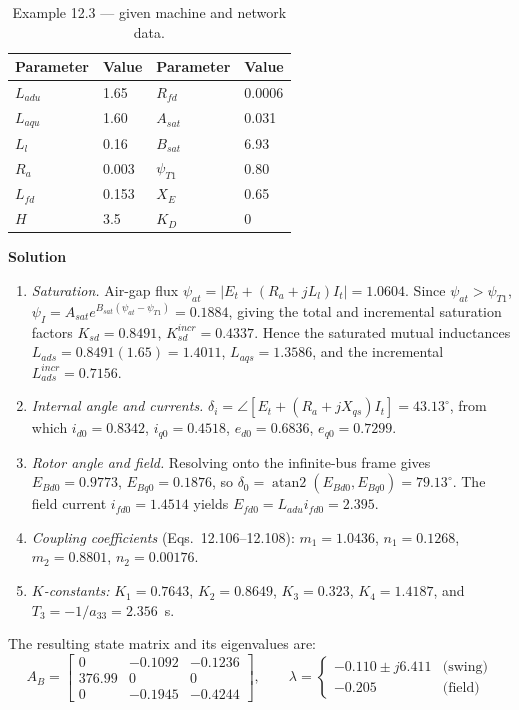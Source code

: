 \documentclass[12pt,a4paper]{article}
\begin{document}
\begin{table}[H]
\centering
\caption{Example 12.3 --- given machine and network data.}
\label{tab:Bgiven}
\begin{tabular}{@{}llll@{}}
\toprule
Parameter & Value & Parameter & Value \\
\midrule
$L_{adu}$ & 1.65 & $R_{fd}$  & 0.0006 \\
$L_{aqu}$ & 1.60 & $A_{sat}$ & 0.031 \\
$L_l$     & 0.16 & $B_{sat}$ & 6.93 \\
$R_a$     & 0.003 & $\psi_{T1}$ & 0.80 \\
$L_{fd}$  & 0.153 & $X_E$ & 0.65 \\
$H$       & 3.5 & $K_D$ & 0 \\
\bottomrule
\end{tabular}
\end{table}
\newpage
\textbf{Solution}
\begin{enumerate}
\item \textit{Saturation.} Air-gap flux
      $\psi_{at} = |E_t + (R_a + jL_l)I_t| = 1.0604$. Since
      $\psi_{at}>\psi_{T1}$,
      $\psi_I = A_{sat}e^{B_{sat}(\psi_{at}-\psi_{T1})} = 0.1884$, giving the
      total and incremental saturation factors $K_{sd}=0.8491$,
      $K_{sd}^{incr}=0.4337$. Hence the saturated mutual inductances
      $L_{ads}=0.8491(1.65)=1.4011$, $L_{aqs}=1.3586$, and the incremental
      $L_{ads}^{incr}=0.7156$.
\item \textit{Internal angle and currents.}
      $\delta_i = \angle\!\left[E_t + (R_a + jX_{qs})I_t\right] = 43.13^\circ$,
      from which $i_{d0}=0.8342$, $i_{q0}=0.4518$, $e_{d0}=0.6836$,
      $e_{q0}=0.7299$.
\item \textit{Rotor angle and field.} Resolving onto the infinite-bus frame
      gives $E_{Bd0}=0.9773$, $E_{Bq0}=0.1876$, so
      $\delta_0 = \operatorname{atan2}(E_{Bd0},E_{Bq0}) = 79.13^\circ$. The field
      current $i_{fd0}=1.4514$ yields $E_{fd0}=L_{adu}i_{fd0}=2.395$.
\item \textit{Coupling coefficients} (Eqs.~12.106--12.108):
      $m_1 = 1.0436$, $n_1 = 0.1268$, $m_2 = 0.8801$, $n_2 = 0.00176$.
\item \textit{$K$-constants:} $K_1 = 0.7643$, $K_2 = 0.8649$, $K_3 = 0.323$,
      $K_4 = 1.4187$, and $T_3 = -1/a_{33} = 2.356$~s.
\end{enumerate}

The resulting state matrix and its eigenvalues are:
\begin{equation}
A_B =
\begin{bmatrix}
0 & -0.1092 & -0.1236 \\
376.99 & 0 & 0 \\
0 & -0.1945 & -0.4244
\end{bmatrix},
\qquad
\lambda =
\begin{cases}
-0.110 \pm j6.411 & \text{(swing)} \\
-0.205 & \text{(field)}
\end{cases}
\end{equation}
\end{document}
